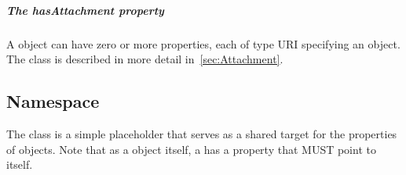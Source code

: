 \subparagraph{The hasAttachment property}
\label{sec:hasAttachment}
A  object can have zero or more  properties, each of type URI specifying an  object. The  class is described in more detail in~\ref{sec:Attachment}.


\subsection{Namespace}
\label{sec:Namespace}

The  class is a simple placeholder that serves as a shared target for the  properties of  objects.
Note that as a  object itself, a  has a  property that MUST point to itself.

